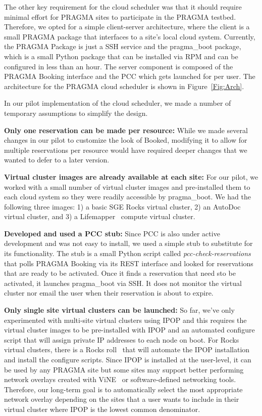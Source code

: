 \documentclass{acm_proc_article-sp}
\begin{document}
The other key requirement for the cloud scheduler was that it should require minimal effort for PRAGMA sites to participate in the PRAGMA testbed.  Therefore, we opted for a simple client-server architecture, where the client is a small PRAGMA package that interfaces to a site's local cloud system.  Currently, the PRAGMA Package is just a SSH service and the pragma\_boot package, which is a small Python package that can be installed via RPM and can be configured in less than an hour.  The server component is composed of the PRAGMA Booking interface and the PCC which gets launched for per user.  The architecture for the PRAGMA cloud scheduler is shown in Figure~\ref{Fig:Arch}.

In our pilot implementation of the cloud scheduler, we made a number of temporary assumptions to simplify the design.

\textbf{Only one reservation can be made per resource:}  While we made several changes in our pilot to customize the look of Booked, modifying it to allow for multiple reservations per resource would have required deeper changes that we wanted to defer to a later version.   

\textbf{Virtual cluster images are already available at each site:}  For our pilot, we worked with a small number of virtual cluster images and pre-installed them to each cloud system so they were readily accessible by pragma\_boot.  We had the following three images: 1) a basic SGE Rocks virtual cluster, 2) an AutoDoc virtual cluster, and 3) a Lifemapper~\cite{lifemapper} compute virtual cluster.   

\textbf{Developed and used a PCC stub:}  Since PCC is also under active development and was not easy to install, we used a simple stub to substitute for its functionality.  The stub is a small Python script called \textit{pcc-check-reservations} that polls PRAGMA Booking via its REST interface and looked for reservations that are ready to be activated.  Once it finds a reservation that need sto be activated, it launches pragma\_boot via SSH.  It does not  monitor the virtual cluster nor email the user when their reservation is about to expire.  

\textbf{Only single site virtual clusters can be launched:}  So far, we've only experimented with multi-site virtual clusters using IPOP and this requires the virtual cluster images to be pre-installed with IPOP and an automated configure script that will assign private IP addresses to each node on boot.  For Rocks virtual clusters, there is a Rocks roll~\cite{ipoproll} that will automate the IPOP installation and install the configure scripts.  Since IPOP is installed at the user-level, it can be used by any PRAGMA site but some sites may support better performing network overlays created with ViNE~\cite{vine} or software-defined networking tools.  Therefore, our long-term goal is to automatically select the most appropriate network overlay depending on the sites that a user wants to include in their virtual cluster where IPOP is the lowest common denominator.
\end{document}
